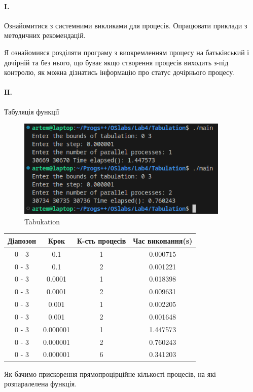 \documentclass[12pt]{extarticle}
\begin{document}
\paragraph{I.} Ознайомитися з системними викликами для процесів. Опрацювати
приклади з методичних рекомендацій.

\vspace{12pt}
Я ознайомився розділяти програму з виокремленням процесу на батьківський і дочірній та без нього,
що буває якщо створення процесів виходить з-під контролю, як можна дізнатись інформацію про статус дочірнього процесу.

\paragraph{IІ.}Табуляція функції
\begin{figure}[H]
    \centering
    \includegraphics[width=0.90\textwidth]{tab.png}
    \caption{Tabukation}
\end{figure}

\begin{center}
    \begin{tabular}{| c | c | c | c |}
        \hline
        Діапозон &Крок& К-сть процесів & Час виконання(s)\\
        \hline
        0 - 3 &  0.1  & 1 & 0.000715 \\
        0 - 3 &  0.1  & 2 & 0.001221 \\
        \hline
        0 - 3 &  0.0001  & 1 & 0.018398 \\
        0 - 3 &  0.0001  & 2 & 0.009631 \\
        \hline
        0 - 3 &  0.001  & 1 & 0.002205 \\
        0 - 3 &  0.001  & 2 & 0.001648 \\
        \hline
        0 - 3 &  0.000001  & 1 & 1.447573 \\
        0 - 3 &  0.000001  & 2 & 0.760243 \\
        0 - 3 &  0.000001  & 6 & 0.341203 \\
        \hline
   
    \end{tabular}

    \vspace{12pt}
    Як бачимо прискорення прямопроцірційне кількості процесів, на які розпаралелена функція.

\end{center}
\break
\end{document}
